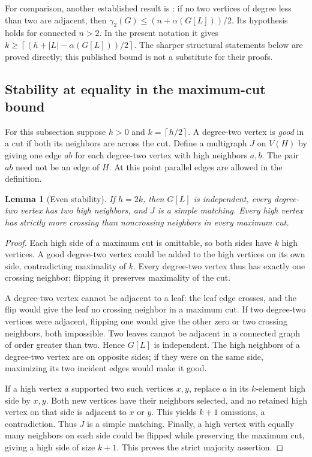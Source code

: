 \documentclass[11pt,a4paper]{article}
\newtheorem{lemma}[theorem]{Lemma}
\theoremstyle{definition}\newtheorem{definition}[theorem]{Definition}
\theoremstyle{remark}\newtheorem{remark}[theorem]{Remark}
\newcommand{\ceil}[1]{\left\lceil#1\right\rceil}
\begin{document}
For comparison, another established result is
\cite[Theorem 5]{paired:DGH}: if no two vertices of degree less than two
are adjacent, then $\gamma_2(G)\le(n+\alpha(G[L]))/2$. Its hypothesis
holds for connected $n>2$. In the present notation it gives
$k\ge\ceil{(h+|L|-\alpha(G[L]))/2}$. The sharper structural statements
below are proved directly; this published bound is not a substitute for
their proofs.

\subsection{Stability at equality in the maximum-cut bound}
\label{paired:stability-section}

For this subsection suppose $h>0$ and $k=\ceil{h/2}$. A degree-two
vertex is \emph{good} in a cut if both its neighbors are across the cut.
Define a multigraph $J$ on $V(H)$ by giving one edge $ab$ for each
degree-two vertex with high neighbors $a,b$. The pair $ab$ need not be
an edge of $H$. At this point parallel edges are allowed in the definition.

\begin{lemma}[Even stability]\label{paired:even-stability}
If $h=2k$, then $G[L]$ is independent, every degree-two vertex has two
high neighbors, and $J$ is a simple matching. Every high vertex has
strictly more crossing than noncrossing neighbors in every maximum cut.
\end{lemma}
\begin{proof}
Each high side of a maximum cut is omittable, so both sides have $k$
high vertices. A good degree-two vertex could be added to the high
vertices on its own side, contradicting maximality of $k$. Every
degree-two vertex thus has exactly one crossing neighbor; flipping it
preserves maximality of the cut.

A degree-two vertex cannot be adjacent to a leaf: the leaf edge crosses,
and the flip would give the leaf no crossing neighbor in a maximum cut.
If two degree-two vertices were adjacent, flipping one would give the
other zero or two crossing neighbors, both impossible. Two leaves
cannot be adjacent in a connected graph of order greater than two.
Hence $G[L]$ is independent. The high neighbors of a degree-two vertex
are on opposite sides; if they were on the same side, maximizing its
two incident edges would make it good.

If a high vertex $a$ supported two such vertices $x,y$, replace $a$
in its $k$-element high side by $x,y$. Both new vertices have their
neighbors selected, and no retained high vertex on that side is adjacent
to $x$ or $y$. This yields $k+1$ omissions, a contradiction. Thus $J$
is a simple matching. Finally, a high vertex with equally many neighbors
on each side could be flipped while preserving the maximum cut, giving
a high side of size $k+1$. This proves the strict majority assertion.
\end{proof}
\end{document}
